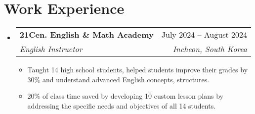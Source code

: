 \documentclass[letterpaper,11pt]{article}
\makeatletter
\newcommand{\resumeItem}[1]{
  \item\small{
    {#1 \vspace{-3pt}}
  }
}
\newcommand{\resumeSubheading}[4]{
    \item
    \begin{tabular*}{0.97\textwidth}[t]{l@{\extracolsep{\fill}}r@{\hspace{-0.2in}}}
        \small{\textbf{#1}} & \small{#2} \\
        \textit{\small#3} & \textit{\small #4} \\
    \end{tabular*}\vspace{-5pt}
}
\newcommand{\resumeSubHeadingListStart}{\begin{itemize}[leftmargin=0.00in, rightmargin=-0.2in, label={}]}
\newcommand{\resumeSubHeadingListEnd}{\end{itemize}\vspace{-7pt}}
\newcommand{\resumeItemListStart}{\begin{itemize}[leftmargin=0.15in, rightmargin=0.15in]}
\newcommand{\resumeItemListEnd}{\end{itemize}\vspace{-7pt}}
\makeatother
\begin{document}



\section{Work Experience}

\resumeSubHeadingListStart
\resumeSubheading
{21Cen. English \& Math Academy}{July 2024 -- August 2024}
{English Instructor}{Incheon, South Korea}
\resumeItemListStart
\resumeItem{Taught 14 high school students, helped students improve their grades by 30\% and understand advanced English concepts, structures.}
\resumeItem{20\% of class time saved by developing 10 custom lesson plans by addressing the specific needs and objectives of all 14 students.}
\resumeItemListEnd
\resumeSubHeadingListEnd
\end{document}
